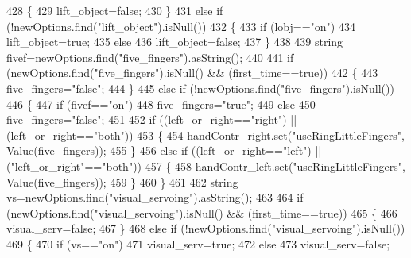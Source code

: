 \begin{DoxyCode}
428     \{
429         lift\_object=\textcolor{keyword}{false};
430     \}
431     \textcolor{keywordflow}{else} \textcolor{keywordflow}{if} (!newOptions.find(\textcolor{stringliteral}{"lift\_object"}).isNull())
432     \{
433         \textcolor{keywordflow}{if} (lobj==\textcolor{stringliteral}{"on"})
434             lift\_object=\textcolor{keyword}{true};
435         \textcolor{keywordflow}{else}
436             lift\_object=\textcolor{keyword}{false};
437     \}
438 
439     \textcolor{keywordtype}{string} fivef=newOptions.find(\textcolor{stringliteral}{"five\_fingers"}).asString();
440 
441     \textcolor{keywordflow}{if} (newOptions.find(\textcolor{stringliteral}{"five\_fingers"}).isNull() && (first\_time==\textcolor{keyword}{true}))
442     \{
443         five\_fingers=\textcolor{stringliteral}{"false"};
444     \}
445     \textcolor{keywordflow}{else} \textcolor{keywordflow}{if} (!newOptions.find(\textcolor{stringliteral}{"five\_fingers"}).isNull())
446     \{
447         \textcolor{keywordflow}{if} (fivef==\textcolor{stringliteral}{"on"})
448             five\_fingers=\textcolor{stringliteral}{"true"};
449         \textcolor{keywordflow}{else} 
450             five\_fingers=\textcolor{stringliteral}{"false"};
451 
452         \textcolor{keywordflow}{if} ((left\_or\_right==\textcolor{stringliteral}{"right"}) || (left\_or\_right==\textcolor{stringliteral}{"both"}))
453         \{
454             handContr_right.set(\textcolor{stringliteral}{"useRingLittleFingers"}, Value(five\_fingers));
455         \}
456         \textcolor{keywordflow}{else} \textcolor{keywordflow}{if} ((left\_or\_right==\textcolor{stringliteral}{"left"}) || (\textcolor{stringliteral}{"left\_or\_right"}==\textcolor{stringliteral}{"both"}))
457         \{
458             handContr\_left.set(\textcolor{stringliteral}{"useRingLittleFingers"}, Value(five\_fingers));
459         \}
460     \}
461 
462     \textcolor{keywordtype}{string} vs=newOptions.find(\textcolor{stringliteral}{"visual\_servoing"}).asString();
463 
464     \textcolor{keywordflow}{if} (newOptions.find(\textcolor{stringliteral}{"visual\_servoing"}).isNull() && (first\_time==\textcolor{keyword}{true}))
465     \{
466         visual\_serv=\textcolor{keyword}{false};
467     \}
468     \textcolor{keywordflow}{else} \textcolor{keywordflow}{if} (!newOptions.find(\textcolor{stringliteral}{"visual\_servoing"}).isNull())
469     \{
470         \textcolor{keywordflow}{if} (vs==\textcolor{stringliteral}{"on"})
471             visual\_serv=\textcolor{keyword}{true};
472         \textcolor{keywordflow}{else}
473             visual\_serv=\textcolor{keyword}{false};

\end{DoxyCode}

